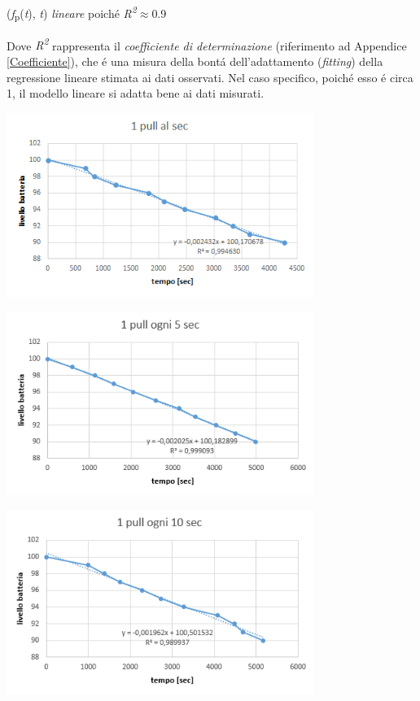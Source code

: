 \documentclass{article}
\begin{document}
\begin{center}
(\textit{f}\textsubscript{p}(\textit{t}), \textit{t})  \textit{lineare} poich\'e \textit{R\textsuperscript{2}}\(\approx\)0.9
\end{center}

Dove \textit{R\textsuperscript{2}} rappresenta il \textit{coefficiente di determinazione} (riferimento ad Appendice \ref{Coefficiente}), che \'e una misura della bont\'a dell'adattamento (\textit{fitting}) della regressione lineare stimata ai dati osservati. Nel caso specifico, poich\'e esso \'e circa 1, il modello lineare si adatta bene ai dati misurati.

\begin{center}
\includegraphics[width=0.75\textwidth]{1alsec.jpg} %
\label{fig:1 pull ogni secondo}
\end{center}

\begin{center}
\includegraphics[width=0.75\textwidth]{5alsec.jpg} %
\label{fig:1 pull ogni 5 secondi}
\end{center}

\begin{center}
\includegraphics[width=0.75\textwidth]{10alsec.jpg} %
\label{fig:1 pull ogni 10 secondi}
\end{center}
\end{document}

